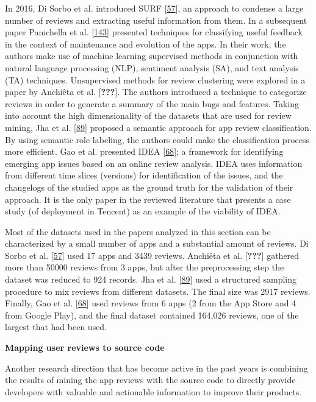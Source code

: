 \documentclass[]{book}
\begin{document}
In 2016, Di Sorbo et al. introduced SURF
{[}\protect\hyperlink{ref-di2016would}{57}{]}, an approach to condense a
large number of reviews and extracting useful information from them. In
a subsequent paper Panichella et al.
{[}\protect\hyperlink{ref-panichella2016ardoc}{143}{]} presented
techniques for classifying useful feedback in the context of maintenance
and evolution of the apps. In their work, the authors make use of
machine learning supervised methods in conjunction with natural language
processing (NLP), sentiment analysis (SA), and text analysis (TA)
techniques. Unsupervised methods for review clustering were explored in
a paper by Anchiêta et al. {[}{\textbf{???}}{]}. The authors introduced
a technique to categorize reviews in order to generate a summary of the
main bugs and features. Taking into account the high dimensionality of
the datasets that are used for review mining, Jha et al.
{[}\protect\hyperlink{ref-jha2017mining}{89}{]} proposed a semantic
approach for app review classification. By using semantic role labeling,
the authors could make the classification process more efficient. Gao et
al. presented IDEA {[}\protect\hyperlink{ref-gao2018online}{68}{]}; a
framework for identifying emerging app issues based on an online review
analysis. IDEA uses information from different time slices (versions)
for identification of the issues, and the changelogs of the studied apps
as the ground truth for the validation of their approach. It is the only
paper in the reviewed literature that presents a case study (of
deployment in Tencent) as an example of the viability of IDEA.

Most of the datasets used in the papers analyzed in this section can be
characterized by a small number of apps and a substantial amount of
reviews. Di Sorbo et al. {[}\protect\hyperlink{ref-di2016would}{57}{]}
used 17 apps and 3439 reviews. Anchiêta et al. {[}{\textbf{???}}{]}
gathered more than 50000 reviews from 3 apps, but after the
preprocessing step the dataset was reduced to 924 records. Jha et al.
{[}\protect\hyperlink{ref-jha2017mining}{89}{]} used a structured
sampling procedure to mix reviews from different datasets. The final
size was 2917 reviews. Finally, Gao et al.
{[}\protect\hyperlink{ref-gao2018online}{68}{]} used reviews from 6 apps
(2 from the App Store and 4 from Google Play), and the final dataset
contained 164,026 reviews, one of the largest that had been used.

\textbf{Mapping user reviews to source code}

Another research direction that has become active in the past years is
combining the results of mining the app reviews with the source code to
directly provide developers with valuable and actionable information to
improve their products.
\end{document}

